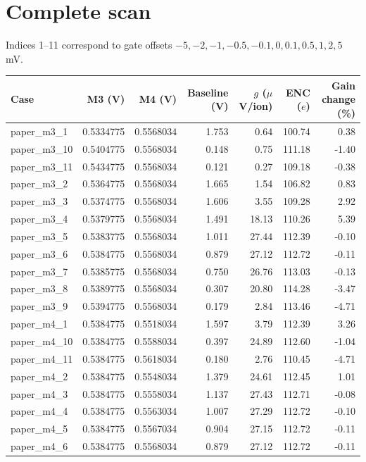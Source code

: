 \documentclass[11pt,a4paper]{article}
\begin{document}
\section*{Complete scan}
Indices 1--11 correspond to gate offsets
$-5,-2,-1,-0.5,-0.1,0,0.1,0.5,1,2,5$ mV.
\small
\begin{longtable}{lrrrrrr}\toprule
Case & M3 (V) & M4 (V) & Baseline (V) & $g$ ($\mu$V/ion) & ENC ($e$) & Gain change (\%)\\\midrule\endhead
paper\_m3\_1 & 0.5334775 & 0.5568034 & 1.753 & 0.64 & 100.74 & 0.38 \\
paper\_m3\_10 & 0.5404775 & 0.5568034 & 0.148 & 0.75 & 111.18 & -1.40 \\
paper\_m3\_11 & 0.5434775 & 0.5568034 & 0.121 & 0.27 & 109.18 & -0.38 \\
paper\_m3\_2 & 0.5364775 & 0.5568034 & 1.665 & 1.54 & 106.82 & 0.83 \\
paper\_m3\_3 & 0.5374775 & 0.5568034 & 1.606 & 3.55 & 109.28 & 2.92 \\
paper\_m3\_4 & 0.5379775 & 0.5568034 & 1.491 & 18.13 & 110.26 & 5.39 \\
paper\_m3\_5 & 0.5383775 & 0.5568034 & 1.011 & 27.44 & 112.39 & -0.10 \\
paper\_m3\_6 & 0.5384775 & 0.5568034 & 0.879 & 27.12 & 112.72 & -0.11 \\
paper\_m3\_7 & 0.5385775 & 0.5568034 & 0.750 & 26.76 & 113.03 & -0.13 \\
paper\_m3\_8 & 0.5389775 & 0.5568034 & 0.307 & 20.80 & 114.28 & -3.47 \\
paper\_m3\_9 & 0.5394775 & 0.5568034 & 0.179 & 2.84 & 113.46 & -4.71 \\
paper\_m4\_1 & 0.5384775 & 0.5518034 & 1.597 & 3.79 & 112.39 & 3.26 \\
paper\_m4\_10 & 0.5384775 & 0.5588034 & 0.397 & 24.89 & 112.60 & -1.04 \\
paper\_m4\_11 & 0.5384775 & 0.5618034 & 0.180 & 2.76 & 110.45 & -4.71 \\
paper\_m4\_2 & 0.5384775 & 0.5548034 & 1.379 & 24.61 & 112.45 & 1.01 \\
paper\_m4\_3 & 0.5384775 & 0.5558034 & 1.137 & 27.43 & 112.71 & -0.08 \\
paper\_m4\_4 & 0.5384775 & 0.5563034 & 1.007 & 27.29 & 112.72 & -0.10 \\
paper\_m4\_5 & 0.5384775 & 0.5567034 & 0.904 & 27.15 & 112.72 & -0.11 \\
paper\_m4\_6 & 0.5384775 & 0.5568034 & 0.879 & 27.12 & 112.72 & -0.11 \\

\end{longtable}
\end{document}

